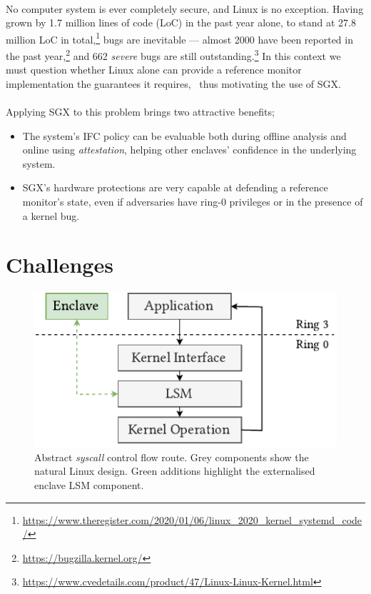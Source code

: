 \paragraph{} No computer system is ever completely secure, and Linux is no exception. Having grown by 1.7 million lines of code (LoC) in the past year alone, to stand at 27.8 million LoC in total,\footnote{\url{https://www.theregister.com/2020/01/06/linux\_2020\_kernel\_systemd\_code/}} bugs are inevitable --- almost 2000 have been reported in the past year,\footnote{\url{https://bugzilla.kernel.org/}} and 662 \textit{severe} bugs are still outstanding.\footnote{\url{https://www.cvedetails.com/product/47/Linux-Linux-Kernel.html}} In this context we must question whether Linux alone can provide a reference monitor implementation the guarantees it requires,~\cite{Lipp2018MeltdownRK, 10.5555/2831143.2831164} thus motivating the use of SGX.

\paragraph{} Applying SGX to this problem brings two attractive benefits;
\begin{itemize}
    \item The system's IFC policy can be evaluable both during offline analysis and online using \textit{attestation}, helping other enclaves' confidence in the underlying system.
    \item SGX's hardware protections are very capable at defending a reference monitor's state, even if adversaries have ring-0 privileges or in the presence of a kernel bug.
\end{itemize}

\section{Challenges}

\begin{figure}[]
    \centering
    \includegraphics[width=0.48\linewidth]{figures/SGX-EnclaveIntegration.pdf}
    \caption{Abstract \textit{syscall} control flow route. Grey components show the natural Linux design. Green additions highlight the externalised enclave LSM component.}
    \vspace{5mm}
    \label{fig:sgx-abstract-integration}
\end{figure}

